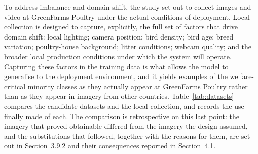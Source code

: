 \documentclass[12pt,a4paper]{report}
\begin{document}
To address imbalance and domain shift, the study set out to collect images and video at GreenFarms Poultry under the actual conditions of deployment. Local collection is designed to capture, explicitly, the full set of factors that drive domain shift: local lighting; camera position; bird density; bird age; breed variation; poultry-house background; litter conditions; webcam quality; and the broader local production conditions under which the system will operate. Capturing these factors in the training data is what allows the model to generalise to the deployment environment, and it yields examples of the welfare-critical minority classes as they actually appear at GreenFarms Poultry rather than as they appear in imagery from other countries. Table~\ref{tab:datasets} compares the candidate datasets and the local collection, and records the use finally made of each. The comparison is retrospective on this last point: the imagery that proved obtainable differed from the imagery the design assumed, and the substitutions that followed, together with the reasons for them, are set out in Section~3.9.2 and their consequences reported in Section~4.1.
\end{document}
